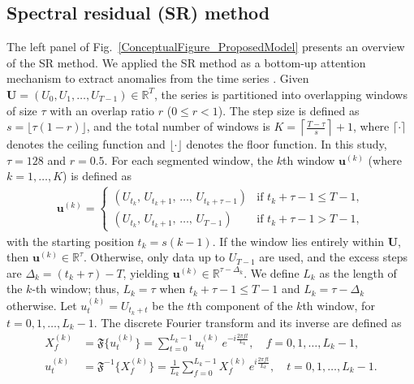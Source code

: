 \documentclass[pdflatex,sn-nature]{sn-jnl}
\theoremstyle{thmstyleone}%
\theoremstyle{thmstyletwo}%
\theoremstyle{thmstylethree}%
\begin{document}
\subsection*{Spectral residual (SR) method}\label{SR}
The left panel of Fig.~\ref{ConceptualFigure_ProposedModel} presents an overview of the SR method.
We applied the SR method as a bottom-up attention mechanism to extract anomalies from the time series \cite{hou2007saliency}. 
Given $ \mathbf{U} = \left( U_{0}, U_{1}, \dots, U_{T-1} \right) \in \mathbb{R}^{T} $, the series is partitioned into overlapping windows of size $\tau$ with an overlap ratio $r$ ($0 \leq r < 1$). 
The step size is defined as $ s = \lfloor \tau (1-r) \rfloor$, and the total number of windows is $K = \left\lceil \frac{T-\tau}{s} \right\rceil + 1$, where \(\lceil \cdot \rceil\) denotes the ceiling function and $\lfloor \cdot \rfloor$ denotes the floor function.
In this study, $\tau = 128$ and $r = 0.5$.
For each segmented window, the \(k\)th window \(\mathbf{u}^{(k)}\) (where \(k = 1,\dots,K\)) is defined as 
\begin{align}
    \mathbf{u}^{(k)} =
    \begin{cases}
        \left( U_{t_k},\, U_{t_k+1},\, \dots,\, U_{t_k+\tau-1} \right) & \text{if } t_k+\tau-1 \leq T-1, \\
        \left( U_{t_k},\, U_{t_k+1},\, \dots,\, U_{T-1} \right) & \text{if } t_k+\tau-1 > T-1,
    \end{cases}
\end{align}
with the starting position $t_k = s(k-1)$. 
If the window lies entirely within \(\mathbf{U}\), then \(\mathbf{u}^{(k)} \in \mathbb{R}^{\tau}\). 
Otherwise, only data up to \(U_{T-1}\) are used, and the excess steps are \(\Delta_k = (t_k + \tau) - T\), yielding \(\mathbf{u}^{(k)} \in \mathbb{R}^{\tau - \Delta_k}\). 
We define \(L_k\) as the length of the \(k\)-th window; thus, \(L_k = \tau\) when \(t_k + \tau - 1 \leq T - 1\) and \(L_k = \tau - \Delta_k\) otherwise.
Let $u^{(k)}_t=U_{t_k+t}$ be the $t$th component of the $k$th window, for $t=0,1,\dots,L_k-1$.
The discrete Fourier transform and its inverse are defined as 
\begin{align}
    X^{(k)}_{f} &= \mathfrak{F}\{ u^{(k)}_t \} = \sum_{t=0}^{L_k-1} u^{(k)}_t\, e^{-i \frac{2\pi f t}{L_k}}, \quad f = 0, 1, \dots, L_k-1, \\
    u^{(k)}_t &= \mathfrak{F}^{-1}\{ X^{(k)}_{f} \} = \frac{1}{L_k}\sum_{f=0}^{L_k-1} X^{(k)}_{f}\, e^{i \frac{2\pi f t}{L_k}}, \quad t = 0, 1, \dots, L_k-1.
\end{align}
\end{document}
